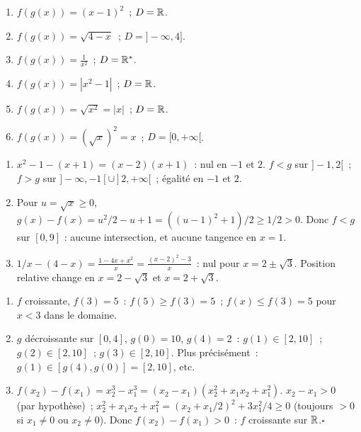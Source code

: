 
\begin{enumerate}
  \item $f(g(x))=(x-1)^2$~; $D=\mathbb{R}$.
  \item $f(g(x))=\sqrt{4-x}$~; $D=]-\infty,4]$.
  \item $f(g(x))=\frac{1}{x^2}$~; $D=\mathbb{R}^*$.
  \item $f(g(x))=|x^2-1|$~; $D=\mathbb{R}$.
  \item $f(g(x))=\sqrt{x^2}=|x|$~; $D=\mathbb{R}$.
  \item $f(g(x))=(\sqrt{x})^2=x$~; $D=[0,+\infty[$.
\end{enumerate}


\begin{enumerate}
  \item $x^2-1-(x+1)=(x-2)(x+1)$~: nul en $-1$ et $2$.
        $f<g$ sur $]-1,2[$~; $f>g$ sur $]-\infty,-1[\cup]2,+\infty[$~; \'egalit\'e en $-1$ et $2$.
  \item Pour $u=\sqrt x\geq0$,
        $g(x)-f(x)=u^2/2-u+1=((u-1)^2+1)/2\geq1/2>0$.
        Donc $f<g$ sur $[0,9]$ : aucune intersection, et aucune tangence en $x=1$.
  \item $1/x-(4-x)=\frac{1-4x+x^2}{x}=\frac{(x-2)^2-3}{x}$~: nul pour $x=2\pm\sqrt{3}$.
        Position relative change en $x=2-\sqrt{3}$ et $x=2+\sqrt{3}$.
\end{enumerate}


\begin{enumerate}
  \item $f$ croissante, $f(3)=5$~: $f(5)\geq f(3)=5$~; $f(x)\leq f(3)=5$ pour $x<3$ dans le domaine.
  \item $g$ d\'ecroissante sur $[0,4]$, $g(0)=10$, $g(4)=2$~:
        $g(1)\in[2,10]$~; $g(2)\in[2,10]$~; $g(3)\in[2,10]$.
        Plus pr\'ecis\'ement~: $g(1)\in[g(4),g(0)]=[2,10]$, etc.
  \item $f(x_2)-f(x_1)=x_2^3-x_1^3=(x_2-x_1)(x_2^2+x_1x_2+x_1^2)$.
        $x_2-x_1>0$ (par hypoth\`ese)~;
        $x_2^2+x_1x_2+x_1^2=(x_2+x_1/2)^2+3x_1^2/4\geq0$ (toujours $>0$ si $x_1\ne0$ ou $x_2\ne0$).
        Donc $f(x_2)-f(x_1)>0$~: $f$ croissante sur $\mathbb{R}$.\hfill$\square$
\end{enumerate}

